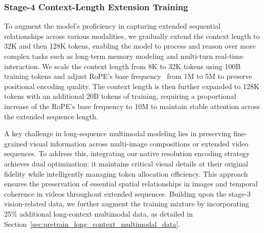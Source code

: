 \documentclass{article}
\begin{document}
\subsubsection{Stage-4 Context-Length Extension Training} %

To augment the model's proficiency in capturing extended sequential relationships across various modalities, we gradually extend the context length to 32K and then 128K tokens, enabling the model to process and reason over more complex tasks such as long-term memory modeling and multi-turn real-time interaction.
We scale the context length from 8K to 32K tokens using 100B training tokens and adjust RoPE's base frequency~\citep{su2024roformer} from 1M to 5M to preserve positional encoding quality. The context length is then further expanded to 128K tokens with an additional 20B tokens of training, requiring a proportional increase of the RoPE's base frequency to 10M to maintain stable attention across the extended sequence length.

A key challenge in long-sequence multimodal modeling lies in preserving fine-grained visual information across multi-image compositions or extended video sequences. 
To address this, integrating our native resolution encoding strategy achieves dual optimization: it maintains critical visual details at their original fidelity while intelligently managing token allocation efficiency. This approach ensures the preservation of essential spatial relationships in images and temporal coherence in videos throughout extended sequences. Building upon the stage-3 vision-related data, we further augment the training mixture by incorporating 25\% additional long-context multimodal data, as detailed in Section~\ref{sec:pretrain_long_context_multimodal_data}. 
\end{document}
